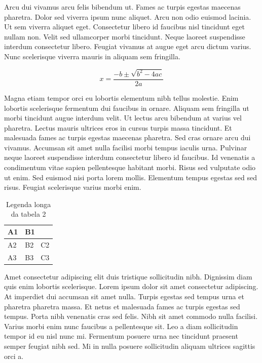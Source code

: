 \documentclass[12pt]{article}
\begin{document}
\begin{multicols}{3}
		Arcu dui vivamus arcu felis bibendum ut. Fames ac turpis egestas maecenas pharetra. Dolor sed viverra ipsum nunc aliquet. Arcu non odio euismod lacinia. Ut sem viverra aliquet eget. Consectetur libero id faucibus nisl tincidunt eget nullam non. Velit sed ullamcorper morbi tincidunt. Neque laoreet suspendisse interdum consectetur libero. Feugiat vivamus at augue eget arcu dictum varius. Nunc scelerisque viverra mauris in aliquam sem fringilla.

		\begin{equation} %
		x = \frac{-b \pm \sqrt{b^2 -4ac}}{2a}
		\end{equation}

		Magna etiam tempor orci eu lobortis elementum nibh tellus molestie. Enim lobortis scelerisque fermentum dui faucibus in ornare. Aliquam sem fringilla ut morbi tincidunt augue interdum velit. Ut lectus arcu bibendum at varius vel pharetra. Lectus mauris ultrices eros in cursus turpis massa tincidunt. Et malesuada fames ac turpis egestas maecenas pharetra. Sed cras ornare arcu dui vivamus. Accumsan sit amet nulla facilisi morbi tempus iaculis urna. Pulvinar neque laoreet suspendisse interdum consectetur libero id faucibus. Id venenatis a condimentum vitae sapien pellentesque habitant morbi. Risus sed vulputate odio ut enim. Sed euismod nisi porta lorem mollis. Elementum tempus egestas sed sed risus. Feugiat scelerisque varius morbi enim.
		\begin{table}[H] %
			\centering
			\caption[Legenda curta da tabela 2]{Legenda longa da tabela 2}
			\label{tab:tab2}
			\begin{tabular}{|l|l|l|}
				\hline
				A1 & \multicolumn{2}{l|}{B1} \\ \hline %
				A2 & B2         & C2         \\ \hline
				A3 & B3         & C3         \\ \hline
			\end{tabular}
		\end{table}
		Amet consectetur adipiscing elit duis tristique sollicitudin nibh. Dignissim diam quis enim lobortis scelerisque. Lorem ipsum dolor sit amet consectetur adipiscing. At imperdiet dui accumsan sit amet nulla. Turpis egestas sed tempus urna et pharetra pharetra massa. Et netus et malesuada fames ac turpis egestas sed tempus. Porta nibh venenatis cras sed felis. Nibh sit amet commodo nulla facilisi. Varius morbi enim nunc faucibus a pellentesque sit. Leo a diam sollicitudin tempor id eu nisl nunc mi. Fermentum posuere urna nec tincidunt praesent semper feugiat nibh sed. Mi in nulla posuere sollicitudin aliquam ultrices sagittis orci a.
		
	\end{multicols}
	\newpage
	
\end{document}
